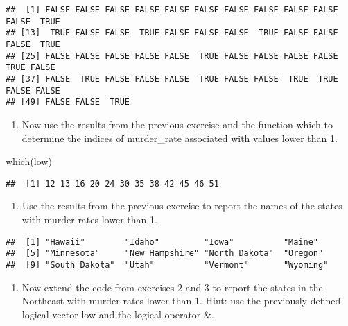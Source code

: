 \documentclass[
]{article}
\newenvironment{Shaded}{\begin{snugshade}}{\end{snugshade}}
\newcommand{\FunctionTok}[1]{\textcolor[rgb]{0.00,0.00,0.00}{#1}}
\newcommand{\NormalTok}[1]{#1}
\newcommand{\SpecialCharTok}[1]{\textcolor[rgb]{0.00,0.00,0.00}{#1}}
\providecommand{\tightlist}{%
  \setlength{\itemsep}{0pt}\setlength{\parskip}{0pt}}
\begin{document}
\begin{verbatim}
##  [1] FALSE FALSE FALSE FALSE FALSE FALSE FALSE FALSE FALSE FALSE FALSE  TRUE
## [13]  TRUE FALSE FALSE  TRUE FALSE FALSE FALSE  TRUE FALSE FALSE FALSE  TRUE
## [25] FALSE FALSE FALSE FALSE FALSE  TRUE FALSE FALSE FALSE FALSE  TRUE FALSE
## [37] FALSE  TRUE FALSE FALSE FALSE  TRUE FALSE FALSE  TRUE  TRUE FALSE FALSE
## [49] FALSE FALSE  TRUE
\end{verbatim}

\begin{enumerate}
\def\labelenumi{\arabic{enumi}.}
\setcounter{enumi}{1}
\tightlist
\item
  Now use the results from the previous exercise and the function which
  to determine the indices of murder\_rate associated with values lower
  than 1.
\end{enumerate}

\begin{Shaded}
\begin{Highlighting}[]
\FunctionTok{which}\NormalTok{(low)}
\end{Highlighting}
\end{Shaded}

\begin{verbatim}
##  [1] 12 13 16 20 24 30 35 38 42 45 46 51
\end{verbatim}

\begin{enumerate}
\def\labelenumi{\arabic{enumi}.}
\setcounter{enumi}{2}
\tightlist
\item
  Use the results from the previous exercise to report the names of the
  states with murder rates lower than 1.
\end{enumerate}

\begin{Shaded}
\end{Shaded}

\begin{verbatim}
##  [1] "Hawaii"        "Idaho"         "Iowa"          "Maine"        
##  [5] "Minnesota"     "New Hampshire" "North Dakota"  "Oregon"       
##  [9] "South Dakota"  "Utah"          "Vermont"       "Wyoming"
\end{verbatim}

\begin{enumerate}
\def\labelenumi{\arabic{enumi}.}
\setcounter{enumi}{3}
\tightlist
\item
  Now extend the code from exercises 2 and 3 to report the states in the
  Northeast with murder rates lower than 1. Hint: use the previously
  defined logical vector low and the logical operator \&.
\end{enumerate}
\end{document}
